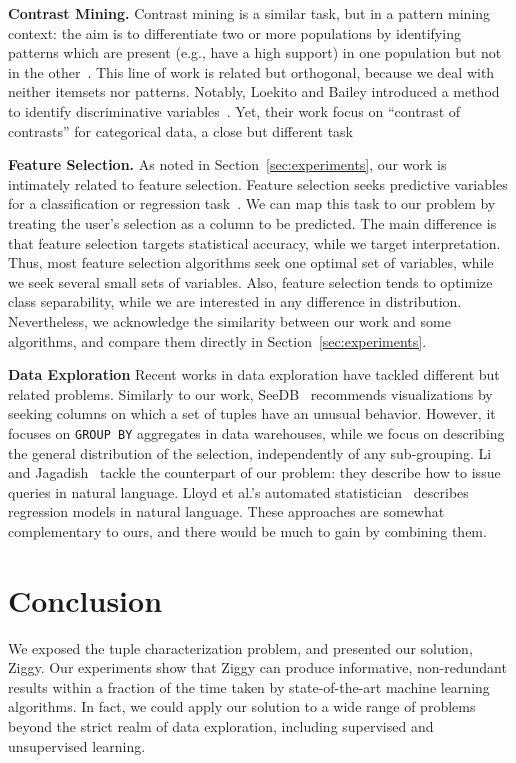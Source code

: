 \textbf{Contrast Mining.} Contrast mining is a similar task, but in a pattern
mining context: the aim is to differentiate two or more populations by
identifying patterns which are present (e.g., have a high support) in one
population but not in the
other~\cite{vreeken2007characterising,webb2008detecting}. This line of work is
related but orthogonal, because we deal with neither itemsets nor patterns.
Notably, Loekito and Bailey introduced a  method to identify discriminative 
variables~\cite{loekito2008mining}.  Yet, their work focus on ``contrast of
contrasts'' for categorical data, a close but different task

\textbf{Feature Selection.} As noted in Section~\ref{sec:experiments}, our work
is intimately related to feature selection. Feature selection seeks predictive
variables for a classification or regression task~\cite{guyon2003introduction}.
We can map this task to our problem by trea\-ting the user's selection as a
column to be predicted. The main difference is that feature selection targets
statistical accuracy, while we target interpretation. Thus, most feature
selection algorithms seek one optimal set of variables, while we seek several
small sets of variables. Also, feature selection tends to optimize class
separability, while we are interested in any difference in distribution.
Nevertheless, we acknowledge the similarity between our work and some
algorithms, and compare them directly in Section~\ref{sec:experiments}.

\textbf{Data Exploration} Recent works in data exploration have tackled
different but related problems. Similarly to our work,
SeeDB~\cite{vartak2015see} re\-com\-mends visualizations by seeking co\-lumns
on which a set of tuples have an unusual behavior. However, it focuses on
\texttt{GROUP BY} aggregates in data warehouses, while we focus on describing
the general distribution of the selection, independently of any sub-grouping.
Li and Jagadish~\cite{li2014constructing} tackle the counterpart of our
problem: they describe how to issue queries in natural language. Lloyd et al.'s
automated statistician~\cite{Lloyd2014ABCD} describes regression models in
natural language. These approaches are somewhat com\-ple\-mentary to ours, and
there would be much to gain by combining them.


\section{Conclusion}
\label{sec:conclusions}
We exposed the tuple characterization problem, and presented our solution,
Ziggy. Our experiments show that Ziggy can produce informative, non-redundant
results within a fraction of the time taken by state-of-the-art machine
learning algorithms. In fact,  we could apply our solution to a wide range of
problems beyond the strict realm of data exploration, including supervised and
unsupervised learning.


